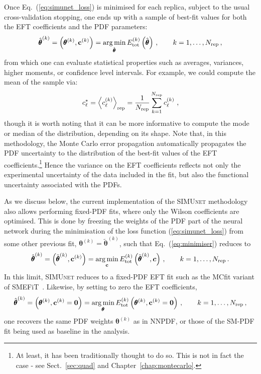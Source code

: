 \documentclass[withindex,glossary]{cam-thesis}
\renewcommand{\vec}[1]{\textbf{#1}} %
\newcommand{\simunet}{\textsc{SIMUnet}}
\DeclareMathOperator*{\argmin}{arg\,min}
\begin{document}
%
Once Eq.~(\ref{eq:simunet_loss}) is minimised for each replica, subject
to the usual cross-validation stopping, one ends up with a sample of
best-fit values for both the EFT
coefficients and the PDF parameters:
\begin{equation}
  \label{eq:minimiser}
  \hat{\pmb{\theta}}^{(k)}
  = \left( \pmb{\theta}^{(k)}, \vec{c}^{(k)}  \right)
  = \argmin_{\hat{\pmb{\theta}}}  E_{\rm tot}^{(k)}\left( \hat{\pmb{\theta}}\right)  \, ,\qquad k=1,\ldots, N_{\rm rep} \, ,
\end{equation}
from which one can evaluate statistical properties such as averages,
variances, higher moments, or confidence level intervals.
For example, we could compute the mean of the sample via:
\begin{equation}
  c_\ell^* = \left\langle c_\ell^{(k)} \right\rangle_{\rm rep} =
  \frac{1}{N_{\rm rep}}\sum_{k=1}^{N_{\rm rep}}  c_\ell^{(k)}
  \ ,
\end{equation}
though it is worth noting that it can be more informative to compute the mode
or median of the distribution, depending on its shape. Note that, in this methodology, the Monte Carlo
error propagation automatically propagates the PDF uncertainty to the
distribution of the best-fit values of the EFT
coefficients.\footnote{At least, it has been traditionally thought to do so. 
This is not in fact the case - see Sect.~\ref{sec:quad} and Chapter~\ref{chap:montecarlo}.} Hence the variance on the EFT coefficients reflects not
only the experimental uncertainty of the data included in the fit, but
also the functional uncertainty associated with the PDFs.

As we discuss below, the current implementation of the 
\simunet{} methodology also allows performing fixed-PDF fits, where
only the Wilson coefficients are optimised. This is done by freezing the weights
 of the PDF part of the neural network during the minimisation of the loss function
 (\ref{eq:simunet_loss}) from some other previous fit, $\boldsymbol{{\theta}}^{(k)}=
 \boldsymbol{\widetilde{\theta}}^{(k)}$, such that Eq.~(\ref{eq:minimiser})
 reduces to
 \begin{equation}
  \label{eq:minimiser2}
  \hat{\pmb{\theta}}^{(k)}
  = \left( \tilde{\pmb{\theta}}^{(k)}, \vec{c}^{(k)}  \right)
  = \argmin_{\vec{c}}  E_{\rm tot}^{(k)}\left( \tilde{\pmb{\theta}}^{(k)},
    \boldsymbol{c} \right)  \, ,\qquad k=1,\ldots, N_{\rm rep} \, .
 \end{equation}
In this limit, \simunet{} reduces to a fixed-PDF EFT fit such as the
 MCfit variant of {\sc\small SMEFiT}~\cite{Giani:2023gfq}. 
 Likewise, by setting to zero the EFT coefficients,
 \begin{equation}
  \label{eq:minimiser3}
  \hat{\pmb{\theta}}^{(k)}
  = \left( \pmb{\theta}^{(k)}, \vec{c}^{(k)} =\vec{0} \right)
  = \argmin_{\pmb{\theta}}  E_{\rm tot}^{(k)}\left( \pmb{\theta}^{(k)},
    \vec{c}^{(k)}=\vec{0} \right)  \, ,\qquad k=1,\ldots, N_{\rm rep} \, ,
 \end{equation}
 one recovers the same PDF weights $\pmb{\theta}^{(k)}$
 as in NNPDF, or those of the SM-PDF fit being used as baseline in
 the analysis. 
\end{document}
